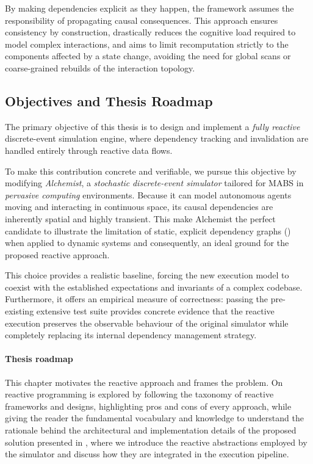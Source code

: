 By making dependencies explicit as they happen, the framework assumes the
responsibility of propagating causal consequences. This approach ensures
consistency by construction, drastically reduces the cognitive load required to
model complex interactions, and aims to limit recomputation strictly to the
components affected by a state change, avoiding the need for global scans or
coarse-grained rebuilds of the interaction topology.

\subsection{Objectives and Thesis Roadmap}
The primary objective of this thesis is to design and implement a \emph{fully
reactive} discrete-event simulation engine, where dependency tracking and
invalidation are handled entirely through reactive data flows. 

To make this contribution concrete and verifiable, we pursue this objective by
modifying \emph{Alchemist}, a \emph{stochastic} \emph{discrete-event simulator}
tailored for \ac{MABS} in \emph{pervasive computing} environments. Because it
can model autonomous agents moving and interacting in continuous space, its
causal dependencies are inherently spatial and highly transient. This make
Alchemist the perfect candidate to illustrate the limitation of static,
explicit dependency graphs () when applied to
dynamic systems and consequently, an ideal ground for the proposed reactive
approach.

This choice provides a realistic baseline, forcing the new execution model to
coexist with the established expectations and invariants of a complex codebase.
Furthermore, it offers an empirical measure of correctness: passing the
pre-existing extensive test suite provides concrete evidence that the reactive
execution preserves the observable behaviour of the original simulator while
completely replacing its internal dependency management strategy.

\paragraph{Thesis roadmap}
This chapter motivates the reactive approach and frames the problem. On
 reactive programming is explored by following the
taxonomy of reactive frameworks and designs, highlighting pros and cons of
every approach, while giving the reader the fundamental vocabulary and
knowledge to understand the rationale behind the architectural and
implementation details of the proposed solution presented in
, where we introduce the reactive
abstractions employed by the simulator and discuss how they are integrated in
the execution pipeline.
